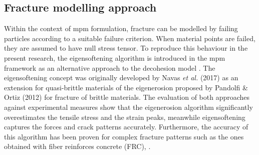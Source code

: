\documentclass[preprint,12pt,a4paper]{elsarticle}
\begin{document}
\subsection{Fracture modelling approach}
\label{sec:2.3}
Within the context of \acrshort{mpm} formulation, fracture can be
modelled by failing particles according to a suitable failure
criterion. When material points are failed, they are assumed to have
null stress tensor. To reproduce this behaviour in the present
research, the eigensoftening algorithm is introduced in the 
\acrshort{mpm} framework as an alternative approach to the decohesion
model \cite{Zhenmao_2005,Schreyer_2002}. The eigensoftening concept
was originally developed by Navas {\it et al.}
(2017)\cite{Navas_2017_ES} as an extension for quasi-brittle materials
of the eigenerosion proposed by Pandolfi \& Ortiz
(2012)\cite{Pandolfi_2012} for fracture of brittle materials. The
  evaluation of both approaches \cite{Navas_2017_ES} against
  experimental measures show that the eigenerosion algorithm significantly overestimates the tensile stress and the strain peaks, meanwhile eigensoftening captures the forces and crack
patterns accurately. Furthermore,
the accuracy of this algorithm has been proven for complex fracture
patterns such as the ones obtained with fiber reinforces concrete (FRC),
\cite{Navas_2018_ES}.\\
\end{document}
